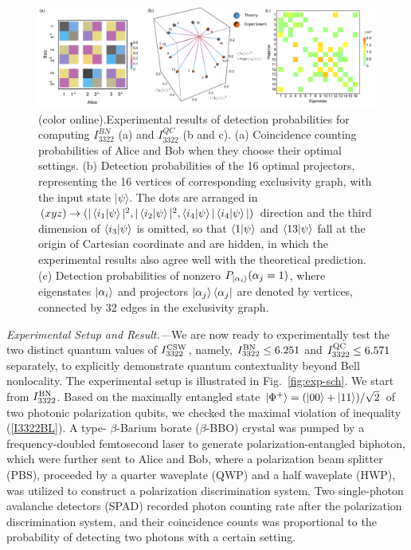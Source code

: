\documentclass[prl,letterpaper,english,reprint,nofootinbib,aps,superscriptaddress,showpacs,showkeys]{revtex4-1}
\theoremstyle{definition}
\theoremstyle{remark}
\newcommand{\rom}[1]{\MakeUppercase{\romannumeral #1}}
\begin{document}
  \begin{figure}[htbp]
     \centering
     \includegraphics[width =160mm]{fig/exp-res-all.pdf}
     \caption{(color online).Experimental results of detection probabilities for computing $I_{3322}^{BN}$ (a) and $I_{3322}^{QC}$ (b and c).
     \label{fig:exp-res-all}
     (a) Coincidence counting probabilities of Alice and Bob when they choose their optimal settings.
     \label{fig:exp-res-all}
     (b) Detection probabilities of the 16 optimal projectors, representing the 16 vertices of corresponding exclusivity graph, with the input state $|\psi\rangle$.
     The dots are arranged in $(xyz)\to(|\braket{i_1|\psi}|^2, |\braket{i_2|\psi}|^2, \braket{i_4|\psi}|\braket{i_4|\psi}|)$ direction and the third dimension of $\braket{i_3|\psi}$ is omitted, so that $\braket{1|\psi}$ and $\braket{13|\psi}$ fall at the origin of Cartesian coordinate and are hidden, in which the experimental results also agree well with the theoretical prediction.
     \label{fig:exp-res-all}
     (c) Detection probabilities of nonzero $P_{\ket{\alpha_i}}(\alpha_j=1)$, where eigenstates $\ket{\alpha_i}$ and projectors $\ket{\alpha_j}\bra{\alpha_j}$ are denoted by vertices, connected by 32 edges in the exclusivity graph.
     }
 \end{figure}




 \emph{Experimental Setup and Result.---}We are now ready to experimentally test the two distinct quantum values of $I^{\rm CSW}_{3322}$, namely, $I_{3322}^{\rm BN}\leq6.251$ and $I_{3322}^{\rm QC}\leq6.571$ separately, to explicitly demonstrate quantum contextuality beyond Bell nonlocality. The experimental setup is illustrated in Fig.~\ref{fig:exp-sch}. We start from $I_{3322}^{\rm BN}$. Based on the maximally entangled state $\ket{\Phi^+}=(|00\rangle+|11\rangle)/\sqrt{2}$ of two photonic polarization qubits, we checked the maximal violation of inequality (\ref{I3322BL}).
 A type-\rom{2} $\beta$-Barium borate ($\beta$-BBO) crystal was pumped by a frequency-doubled femtosecond laser to generate  polarization-entangled biphoton, which were further sent to Alice and Bob, where a polarization beam splitter (PBS), proceeded by a quarter waveplate (QWP) and a half waveplate (HWP), was utilized to construct a polarization discrimination system.
 Two single-photon avalanche detectors (SPAD) recorded photon counting rate after the polarization discrimination system, and their coincidence counts was proportional to the probability of detecting two photons with a certain setting.
\end{document}
